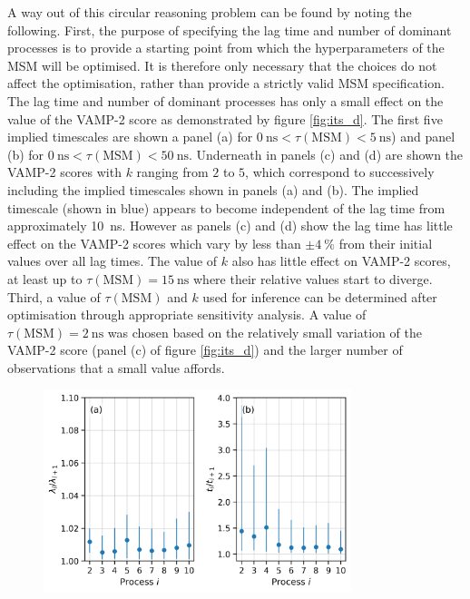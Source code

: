 A way out of this circular reasoning problem can be found by noting the following. First, the purpose of specifying the lag time and number of dominant processes is to provide a starting point from which the hyperparameters of the MSM will be optimised. It is therefore only necessary that the choices do not affect the optimisation, rather than provide a strictly valid MSM specification. The lag time and number of dominant processes has only a small effect on the value of the VAMP-2 score as demonstrated by figure \ref{fig:its_d}. The first five implied timescales are shown a panel (a)  for $\SI{0}{\nano\second} < \tau(\mathrm{MSM}) < \SI{5}{\nano\second}$) and panel (b) for $\SI{0}{\nano\second} < \tau(\mathrm{MSM}) < \SI{50}{\nano\second}$. Underneath in panels (c) and (d) are shown the VAMP-2 scores with $k$ ranging from $2$ to $5$, which correspond to successively including the implied timescales shown in panels (a) and (b). The implied timescale (shown in blue) appears to become independent of the lag time from approximately \SI{10}{\nano\second}. However as panels (c) and (d) show the lag time has little effect on the VAMP-2 scores which vary by less than $\pm\SI{4}{\percent}$ from their initial values over all lag times. The value of $k$ also has little effect on VAMP-2 scores, at least up to $\tau(\mathrm{MSM})=\SI{15}{\nano\second}$ where their relative values start to diverge. Third, a  value of $\tau(\mathrm{MSM})$ and $k$ used for inference can be determined after optimisation through appropriate sensitivity analysis. A value of $\tau(\mathrm{MSM})=\SI{2}{\nano\second}$ was chosen based on the relatively small variation of the VAMP-2 score (panel (c) of figure \ref{fig:its_d}) and the larger number of observations that a small value affords. 

\begin{figure}
    \centering
    \includegraphics[width=0.8\textwidth]{chapters/aadh/figures/timescale_ratios_D.png}
    \label{fig:ts_ratios_d}
\end{figure}

